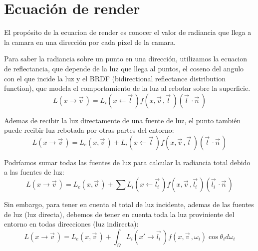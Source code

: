\section{Ecuaci\'on de render}
    El prop\'osito de la ecuacion de render es conocer el valor de radiancia que llega a la camara en una direcci\'on
    por cada pixel  de la camara.

    Para saber la radiancia sobre un punto en una direcci\'on, utilizamos la ecuacion de reflectancia, que depende
    de la luz que llega al puntos, el coseno del angulo con el que incide la luz y el BRDF (bidirectional reflectance
    distribution function), que modela el comportamiento de la luz al rebotar sobre la superficie.
    \begin{equation}
        L(x\xrightarrow{}{\vec{v}{\,}})
        = L_i(x\xleftarrow{}{\vec{l}{\,}})
        f(x, \vec{v}{\,}, \vec{l}{\,})
        (\vec{l}{\,}\cdotp{\vec{n}{\,}})
    \end{equation}
    \singlespacing

    Ademas de recibir la luz directamente de una fuente de luz, el punto tambi\'en puede recibir luz rebotada por otras
    partes del entorno:
    \begin{equation}
        L(x\xrightarrow{}{\vec{v}{\,}})
        = L_e(x, \vec{v}{\,}) +
        L_i(x\xleftarrow{}{\vec{l}{\,}})
        f(x, \vec{v}{\,}, \vec{l}{\,})
        (\vec{l}{\,}\cdotp{\vec{n}{\,}})
    \end{equation}
    \singlespacing

    Podr\'iamos sumar todas las fuentes de luz para calcular la radiancia total debido a las fuentes de luz:
    \begin{equation}
        L(x\xrightarrow{}{\vec{v}{\,}})
        = L_e(x, \vec{v}{\,}) +
        \sum{}L_i(x\xleftarrow{}{\vec{l_i}{\,}})
        f(x, \vec{v}{\,}, \vec{l_i}{\,})
        (\vec{l_i}{\,}\cdotp{\vec{n}{\,}})
    \end{equation}
    \singlespacing

    Sin embargo, para tener en cuenta el total de luz incidente, ademas de las fuentes de luz (luz directa), debemos
    de tener en cuenta toda la luz proviniente del entorno en todas direcciones (luz indirecta):
    \begin{equation}
        L(x\xrightarrow{}{\vec{v}{\,}})
        = L_e(x, \vec{v}{\,}) +
        \int_{\Omega}L_i(x'\xrightarrow{}{\vec{l_i}{\,}})
        f(x, \vec{v}{\,}, \omega_i)
        \cos\theta_id\omega_i
    \end{equation}
    \singlespacing

